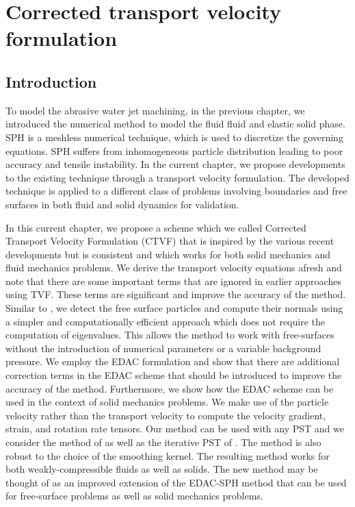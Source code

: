 \chapter{Corrected transport velocity formulation}
\label{chap:ctvf}

\section{Introduction}
\label{sec:intro}
To model the abrasive water jet machining, in the previous chapter, we
introduced the numerical method to model the fluid fluid and elastic solid
phase. SPH is a meshless numerical technique, which is used to discretize the
governing equations. SPH suffers from inhomogeneous particle distribution
leading to poor accuracy and tensile instability. In the current chapter, we
propose developments to the existing technique through a transport velocity
formulation. The developed technique is applied to a different class of problems
involving boundaries and free surfaces in both fluid and solid dynamics for
validation.

In this current chapter, we propose a scheme which we called Corrected Transport
Velocity Formulation (CTVF) that is inspired by the various recent developments
but is consistent and which works for both solid mechanics and fluid mechanics
problems. We derive the transport velocity equations afresh and note that there
are some important terms that are ignored in earlier approaches using TVF. These
terms are significant and improve the accuracy of the method. Similar to
\citep{oger_ale_sph_2016,sun_consistent_2019}, we detect the free surface
particles and compute their normals using a simpler and computationally
efficient approach which does not require the computation of eigenvalues. This
allows the method to work with free-surfaces without the introduction of
numerical parameters or a variable background pressure. We employ the EDAC
formulation and show that there are additional correction terms in the EDAC
scheme that should be introduced to improve the accuracy of the method.
Furthermore, we show how the EDAC scheme can be used in the context of solid
mechanics problems. We make use of the particle velocity rather than the
transport velocity to compute the velocity gradient, strain, and rotation rate
tensors. Our method can be used with any PST and we consider the method of
\cite{sun_consistent_2019} as well as the iterative PST of
\cite{huang_kernel_2019}. The method is also robust to the choice of the
smoothing kernel. The resulting method works for both weakly-compressible fluids
as well as solids. The new method may be thought of as an improved extension of
the EDAC-SPH method that can be used for free-surface problems as well as solid
mechanics problems.

